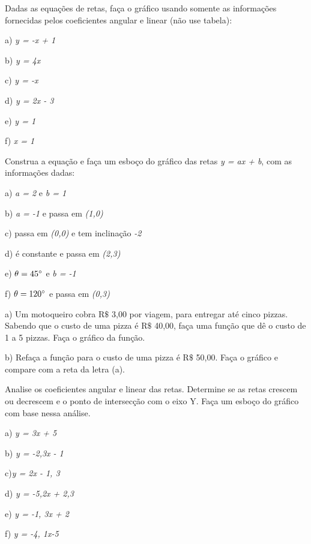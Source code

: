 \begin{exercicios}
\exitem{} Dadas as equações de retas, faça o gráfico usando somente as informações fornecidas pelos coeficientes angular e linear (não use tabela):

\begin{multicols}{2}
a) \textit{y = -x + 1}

b) \textit{y = 4x}

c) \textit{y = -x}

d)  \textit{y = 2x - 3}

e) \textit{y = 1}

f) \textit{x = 1}
\end{multicols}

\exitem{} Construa a equação e faça um esboço do gráfico das retas \textit{y = ax + b}, com as informações dadas:

\begin{multicols}{2}
a) \textit{a = 2} e \textit{b = 1}

b) \textit{a = -1}  e passa em \textit{(1,0)}

c) passa em \textit{(0,0)} e tem inclinação \textit{-2}

d) é constante e passa em \textit{(2,3)}

e)  $\theta = 45\degree$ e \textit{b = -1}

f)  $\theta = 120\degree$ e passa em \textit{(0,3)}
\end{multicols}

\exitem{} a) Um motoqueiro cobra R$\$$  3,00 por viagem, para entregar até cinco pizzas. Sabendo que o custo de uma pizza é R$\$$  40,00, faça uma função que dê o custo de 1 a 5 pizzas. Faça o gráfico da função.

b) Refaça a função para o custo de uma pizza é R$\$$  50,00. Faça o gráfico e compare com a reta da letra (a).

\exitem{} Analise os coeficientes angular e linear das retas. Determine se as retas crescem ou decrescem e o ponto de intersecção com o eixo Y. Faça um esboço do gráfico com base nessa análise.

\begin{multicols}{3}
a) \textit{y = 3x + 5}

b) \textit{y = -2,3x - 1}

c)\textit{y = 2x - 1, 3}

d) \textit{y = -5,2x + 2,3}

e) \textit{y = -1, 3x + 2}

f) \textit{y = -4, 1x-5}
\end{multicols}


\end{exercicios}
